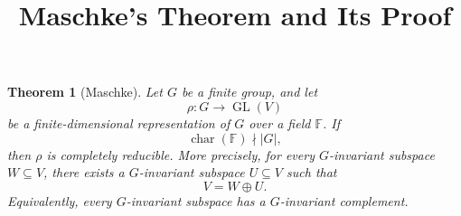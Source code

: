 \documentclass[12pt,a4paper]{article}
\title{Maschke's Theorem and Its Proof}
\author{}
\date{}
\newtheorem{theorem}{Theorem}
\theoremstyle{remark}
\begin{document}
\maketitle

\begin{theorem}[Maschke]
Let \(G\) be a finite group, and let
\[
  \rho: G \longrightarrow \operatorname{GL}(V)
\]
be a finite-dimensional representation of \(G\) over a field \(\mathbb{F}\).
If
\[
  \operatorname{char}(\mathbb{F}) \nmid |G|,
\]
then \(\rho\) is completely reducible. More precisely, for every
\(G\)-invariant subspace \(W \subseteq V\), there exists a \(G\)-invariant
subspace \(U \subseteq V\) such that
\[
  V = W \oplus U.
\]
Equivalently, every \(G\)-invariant subspace has a \(G\)-invariant
complement.
\end{theorem}
\end{document}
